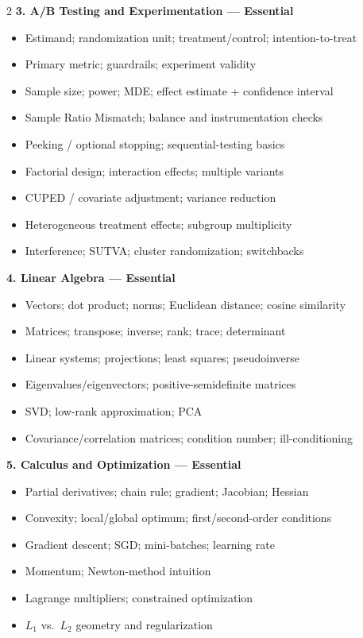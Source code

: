 \documentclass[9pt,a4paper]{article}
\newcommand{\topic}[1]{%
    \vspace{2.2mm}
    {\large\bfseries #1}\par
    \vspace{0.5mm}
}
\begin{document}
\begin{multicols}{2}
\topic{3. A/B Testing and Experimentation --- Essential}
\begin{itemize}
    \item Estimand; randomization unit; treatment/control; intention-to-treat
    \item Primary metric; guardrails; experiment validity
    \item Sample size; power; MDE; effect estimate + confidence interval
    \item Sample Ratio Mismatch; balance and instrumentation checks
    \item Peeking / optional stopping; sequential-testing basics
    \item Factorial design; interaction effects; multiple variants
    \item CUPED / covariate adjustment; variance reduction
    \item Heterogeneous treatment effects; subgroup multiplicity
    \item Interference; SUTVA; cluster randomization; switchbacks
\end{itemize}

\topic{4. Linear Algebra --- Essential}
\begin{itemize}
    \item Vectors; dot product; norms; Euclidean distance; cosine similarity
    \item Matrices; transpose; inverse; rank; trace; determinant
    \item Linear systems; projections; least squares; pseudoinverse
    \item Eigenvalues/eigenvectors; positive-semidefinite matrices
    \item SVD; low-rank approximation; PCA
    \item Covariance/correlation matrices; condition number; ill-conditioning
\end{itemize}

\topic{5. Calculus and Optimization --- Essential}
\begin{itemize}
    \item Partial derivatives; chain rule; gradient; Jacobian; Hessian
    \item Convexity; local/global optimum; first/second-order conditions
    \item Gradient descent; SGD; mini-batches; learning rate
    \item Momentum; Newton-method intuition
    \item Lagrange multipliers; constrained optimization
    \item $L_1$ vs.\ $L_2$ geometry and regularization
\end{itemize}


\end{multicols}
\end{document}
